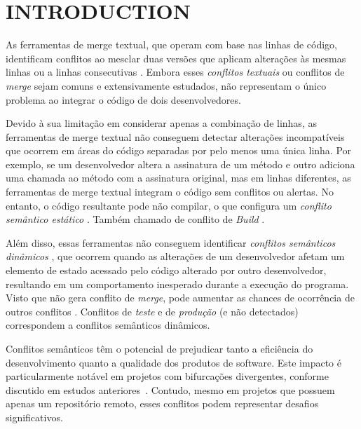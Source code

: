 \documentclass[sigconf,review]{acmart}
\begin{document}
\maketitle

\section{INTRODUCTION}

As ferramentas de merge textual, que operam com base nas linhas de código, identificam conflitos ao mesclar duas versões que aplicam alterações às mesmas linhas ou a linhas consecutivas \cite{accioly2018understanding}. Embora esses \emph{conflitos textuais} ou conflitos de \emph{merge} sejam comuns e extensivamente estudados, não representam o único problema ao integrar o código de dois desenvolvedores.

Devido à sua limitação em considerar apenas a combinação de linhas, as ferramentas de merge textual não conseguem detectar alterações incompatíveis que ocorrem em áreas do código separadas por pelo menos uma única linha. Por exemplo, se um desenvolvedor altera a assinatura de um método e outro adiciona uma chamada ao método com a assinatura original, mas em linhas diferentes, as ferramentas de merge textual integram o código sem conflitos ou alertas. No entanto, o código resultante pode não compilar, o que configura um \emph{conflito semântico estático} \cite{sarma2011palantir, brun2013early, towqir2022detecting, silva2022detecting, zhang2022using,sung2020towards}. Também chamado de conflito de \emph{Build} .

Além disso, essas ferramentas não conseguem identificar \emph{conflitos semânticos dinâmicos} \cite{Horwitz1989IntegratingNV, yang1992program, shao2009sca, brun2013early, pastore2017bdci, barros2017using, sousa2018verified, da2020detecting, zhang2022using}, que ocorrem quando as alterações de um desenvolvedor afetam um elemento de estado acessado pelo código alterado por outro desenvolvedor, resultando em um comportamento inesperado durante a execução do programa. Visto que não gera conflito de \textit{merge}, pode aumentar as chances de ocorrência de outros conflitos \cite{lima2014abordagem}. Conflitos de \emph{teste} e de \emph{produção} (e não detectados) correspondem a conflitos semânticos dinâmicos.

Conflitos semânticos têm o potencial de prejudicar tanto a eficiência do desenvolvimento quanto a qualidade dos produtos de software. Este impacto é particularmente notável em projetos com bifurcações divergentes, conforme discutido em estudos anteriores~\cite{sung2020towards, zhang2022using, mens2002state, zimmermann2007mining, bird2012assessing, brun2013early}. Contudo, mesmo em projetos que possuem apenas um repositório remoto, esses conflitos podem representar desafios significativos.
\end{document}
